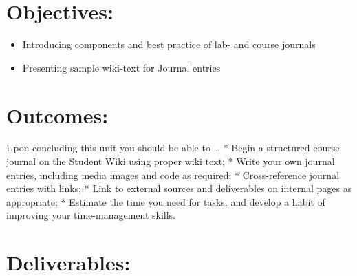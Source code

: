 \documentclass[]{book}
\providecommand{\tightlist}{%
  \setlength{\itemsep}{0pt}\setlength{\parskip}{0pt}}
\begin{document}
\section{Objectives:}\label{objectives-1}

\begin{itemize}
\tightlist
\item
  Introducing components and best practice of lab- and course journals
\item
  Presenting sample wiki-text for Journal entries
\end{itemize}

\section{Outcomes:}\label{outcomes-1}

Upon concluding this unit you should be able to \ldots{} * Begin a
structured course journal on the Student Wiki using proper wiki text; *
Write your own journal entries, including media images and code as
required; * Cross-reference journal entries with links; * Link to
external sources and deliverables on internal pages as appropriate; *
Estimate the time you need for tasks, and develop a habit of improving
your time-management skills.

\section{Deliverables:}\label{deliverables-1}
\end{document}
